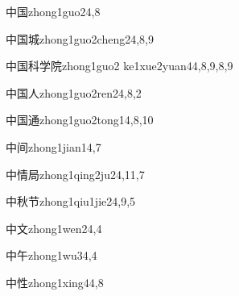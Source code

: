 \begin{verbete}{中国}{zhong1guo2}{4,8}
\end{verbete}

\begin{verbete}{中国城}{zhong1guo2cheng2}{4,8,9}
\end{verbete}

\begin{verbete}{中国科学院}{zhong1guo2 ke1xue2yuan4}{4,8,9,8,9}
\end{verbete}

\begin{verbete}{中国人}{zhong1guo2ren2}{4,8,2}
\end{verbete}

\begin{verbete}{中国通}{zhong1guo2tong1}{4,8,10}
\end{verbete}

\begin{verbete}{中间}{zhong1jian1}{4,7}
\end{verbete}

\begin{verbete}{中情局}{zhong1qing2ju2}{4,11,7}
\end{verbete}

\begin{verbete}{中秋节}{zhong1qiu1jie2}{4,9,5}
\end{verbete}

\begin{verbete}{中文}{zhong1wen2}{4,4}
\end{verbete}

\begin{verbete}{中午}{zhong1wu3}{4,4}
\end{verbete}

\begin{verbete}{中性}{zhong1xing4}{4,8}
\end{verbete}

